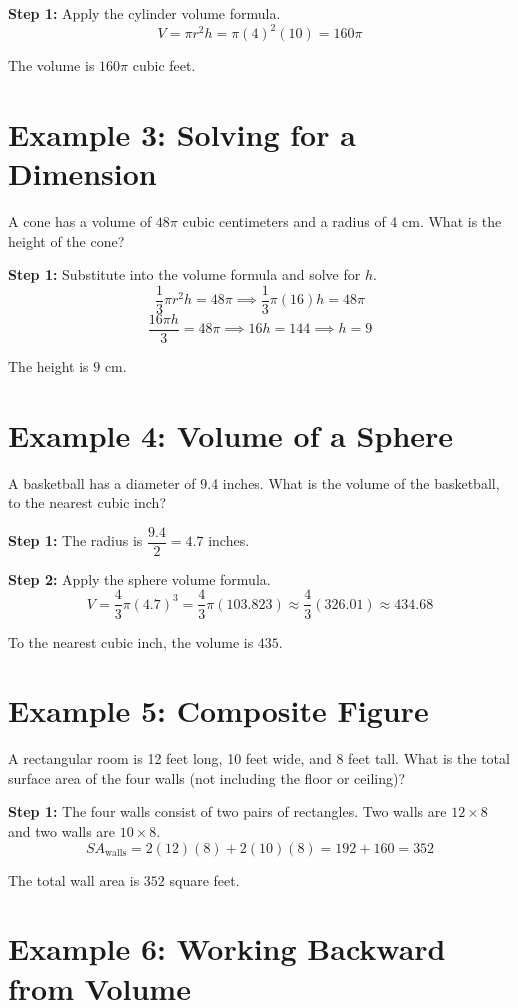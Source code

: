\documentclass[14pt]{extarticle}
\begin{document}
\textbf{Step 1:} Apply the cylinder volume formula.
\[
V = \pi r^2 h = \pi(4)^2(10) = 160\pi
\]

The volume is \(\boxed{160\pi}\) cubic feet.

\section*{Example 3: Solving for a Dimension}

A cone has a volume of \(48\pi\) cubic centimeters and a radius of 4 cm. What is the height of the cone?

\textbf{Step 1:} Substitute into the volume formula and solve for \(h\).
\[
\frac{1}{3}\pi r^2 h = 48\pi \implies \frac{1}{3}\pi(16)h = 48\pi
\]
\[
\frac{16\pi h}{3} = 48\pi \implies 16h = 144 \implies h = 9
\]

The height is \(\boxed{9}\) cm.

\section*{Example 4: Volume of a Sphere}

A basketball has a diameter of 9.4 inches. What is the volume of the basketball, to the nearest cubic inch?

\textbf{Step 1:} The radius is \(\dfrac{9.4}{2} = 4.7\) inches.

\textbf{Step 2:} Apply the sphere volume formula.
\[
V = \frac{4}{3}\pi(4.7)^3 = \frac{4}{3}\pi(103.823) \approx \frac{4}{3}(326.01) \approx 434.68
\]

To the nearest cubic inch, the volume is \(\boxed{435}\).

\section*{Example 5: Composite Figure}

A rectangular room is 12 feet long, 10 feet wide, and 8 feet tall. What is the total surface area of the four walls (not including the floor or ceiling)?

\textbf{Step 1:} The four walls consist of two pairs of rectangles. Two walls are \(12 \times 8\) and two walls are \(10 \times 8\).
\[
SA_{\text{walls}} = 2(12)(8) + 2(10)(8) = 192 + 160 = 352
\]

The total wall area is \(\boxed{352}\) square feet.

\section*{Example 6: Working Backward from Volume}
\end{document}
